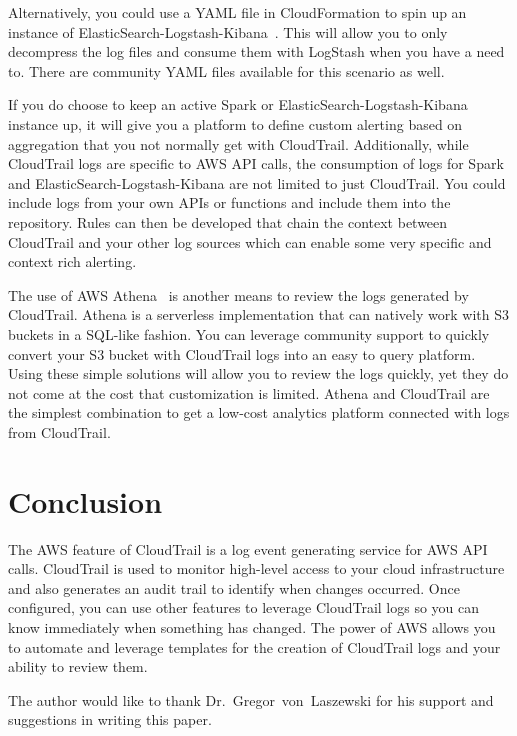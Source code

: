 Alternatively, you could use a YAML file in CloudFormation to spin up an 
instance of ElasticSearch-Logstash-Kibana~\cite{hid-sp18-518-CloudTrail-ELK}. 
This will allow you to only decompress the log files and consume them with 
LogStash when you have a need to. There are community YAML files available
for this scenario as well.

If you do choose to keep an active Spark or ElasticSearch-Logstash-Kibana
instance up, it will give you a platform to define custom alerting based on
aggregation that you not normally get with CloudTrail. Additionally, while
CloudTrail logs are specific to AWS API calls, the consumption of logs for
Spark and ElasticSearch-Logstash-Kibana are not limited to just CloudTrail.
You could include logs from your own APIs or functions and include them into
the repository. Rules can then be developed that chain the context between 
CloudTrail and your other log sources which can enable some very specific
and context rich alerting.

The use of AWS Athena~\cite{hid-sp18-518-CloudTrail-Athena} is another means
to review the logs generated by CloudTrail. Athena is a serverless 
implementation that can natively work with S3 buckets in a SQL-like fashion.
You can leverage community support to quickly convert your S3 bucket with
CloudTrail logs into an easy to query platform. Using these simple solutions
will allow you to review the logs quickly, yet they do not come at the cost 
that customization is limited. Athena and CloudTrail are the simplest 
combination to get a low-cost analytics platform connected with logs from
CloudTrail.

\section{Conclusion}

The AWS feature of CloudTrail is a log event generating service for AWS API 
calls. CloudTrail is used to monitor high-level access to your cloud 
infrastructure and also generates an audit trail to identify when changes 
occurred. Once configured, you can use other features to leverage CloudTrail 
logs so you can know immediately when something has changed. The power of AWS 
 allows you to automate and leverage templates for the creation of CloudTrail
 logs and your ability to review them.

\begin{acks}

The author would like to thank Dr.~Gregor~von~Laszewski for his support and 
suggestions in writing this paper.

\end{acks}


 


